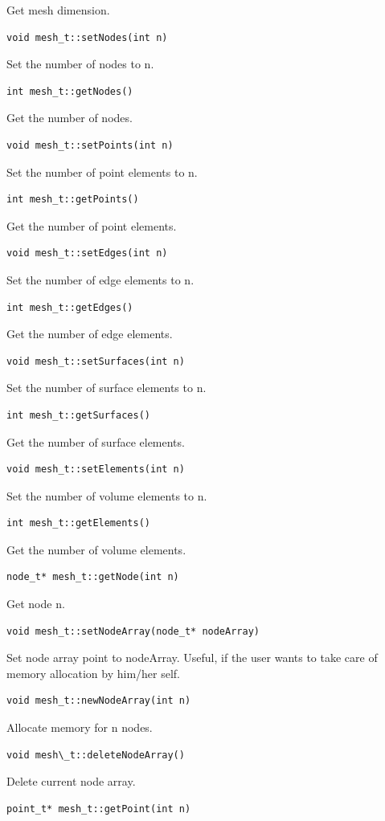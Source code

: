 Get mesh dimension.
\begin{verbatim}  
void mesh_t::setNodes(int n)
\end{verbatim}
Set the number of nodes to n.
\begin{verbatim} 
int mesh_t::getNodes()
\end{verbatim}
Get the number of nodes.
\begin{verbatim} 
void mesh_t::setPoints(int n)
\end{verbatim}
Set the number of point elements to n.
\begin{verbatim} 
int mesh_t::getPoints()
\end{verbatim}
Get the number of point elements.
\begin{verbatim} 
void mesh_t::setEdges(int n)
\end{verbatim}
Set the number of edge elements to n.
\begin{verbatim}   
int mesh_t::getEdges()
\end{verbatim}
Get the number of edge elements.
\begin{verbatim} 
void mesh_t::setSurfaces(int n)
\end{verbatim}
Set the number of surface elements to n.
\begin{verbatim} 
int mesh_t::getSurfaces()
\end{verbatim}
Get the number of surface elements.
\begin{verbatim} 
void mesh_t::setElements(int n)
\end{verbatim}
Set the number of volume elements to n.
\begin{verbatim} 
int mesh_t::getElements()
\end{verbatim}
Get the number of volume elements.
\begin{verbatim} 
node_t* mesh_t::getNode(int n)
\end{verbatim}
Get node n.
\begin{verbatim} 
void mesh_t::setNodeArray(node_t* nodeArray)
\end{verbatim}
Set node array point to nodeArray. Useful, if the user wants to take care of memory allocation by him/her self.
\begin{verbatim} 
void mesh_t::newNodeArray(int n)
\end{verbatim}
Allocate memory for n nodes.
\begin{verbatim}
void mesh\_t::deleteNodeArray()
\end{verbatim}
Delete current node array.
\begin{verbatim}
point_t* mesh_t::getPoint(int n)
\end{verbatim}
